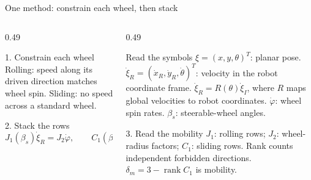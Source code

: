 \documentclass[aspectratio=169]{beamer}
\begin{document}
\begin{frame}[t]{One method: constrain each wheel, then stack}
\small
\setlength{\abovedisplayskip}{1mm}\setlength{\belowdisplayskip}{1mm}
\setlength{\abovedisplayshortskip}{0pt}\setlength{\belowdisplayshortskip}{0pt}
\begin{columns}[T,onlytextwidth]\begin{column}{0.49\textwidth}
\begin{block}{1. Constrain each wheel}
Rolling: speed along its driven direction matches wheel spin. Sliding: no speed across a standard wheel.
\end{block}\vspace{2mm}
\begin{block}{2. Stack the rows}
\[J_1(\beta_s)\dot\xi_R=J_2\dot\varphi,\qquad C_1(\beta_s)\dot\xi_R=0.\]
\end{block}\vspace{2mm}
\end{column}\begin{column}{0.49\textwidth}
\begin{block}{Read the symbols}
$\xi=(x,y,\theta)^T$: planar pose. $\dot\xi_R=(\dot x_R,\dot y_R,\dot\theta)^T$: velocity in the robot coordinate frame. $\dot\xi_R=R(\theta)\dot\xi_I$, where $R$ maps global velocities to robot coordinates. $\dot\varphi$: wheel spin rates. $\beta_s$: steerable-wheel angles.
\end{block}\vspace{2mm}
\begin{block}{3. Read the mobility}
$J_1$: rolling rows; $J_2$: wheel-radius factors; $C_1$: sliding rows. Rank counts independent forbidden directions. $\delta_m=3-\operatorname{rank}C_1$ is mobility.
\end{block}\vspace{2mm}
\end{column}\end{columns}
\end{frame}
\end{document}
